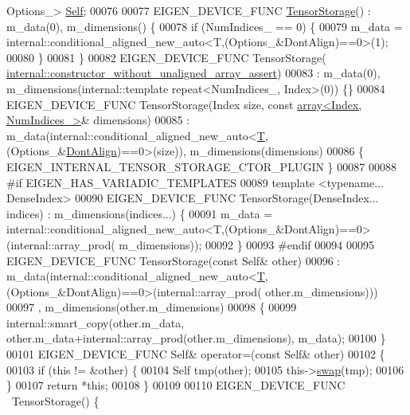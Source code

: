 \begin{DoxyCode}
       Options\_> \hyperlink{class_eigen_1_1_tensor_storage_3_01_t_00_01_d_sizes_3_01_index_type_00_01_num_indices___01_4_00_01_options___01_4}{Self};
00076 
00077     EIGEN\_DEVICE\_FUNC \hyperlink{class_eigen_1_1_tensor_storage}{TensorStorage}() : m\_data(0), m\_dimensions() \{
00078       \textcolor{keywordflow}{if} (NumIndices\_ == 0) \{
00079     m\_data = internal::conditional\_aligned\_new\_auto<T,(Options\_&DontAlign)==0>(1);
00080       \}
00081     \}
00082     EIGEN\_DEVICE\_FUNC TensorStorage(
      \hyperlink{struct_eigen_1_1internal_1_1constructor__without__unaligned__array__assert}{internal::constructor\_without\_unaligned\_array\_assert})
00083       : m\_data(0), m\_dimensions(internal::template repeat<NumIndices\_, Index>(0)) \{\}
00084     EIGEN\_DEVICE\_FUNC TensorStorage(Index size, \textcolor{keyword}{const} \hyperlink{class_eigen_1_1array}{array<Index, NumIndices\_>}& 
      dimensions)
00085         : m\_data(internal::conditional\_aligned\_new\_auto<\hyperlink{group___sparse_core___module}{T},(Options\_&\hyperlink{group__enums_ggaacded1a18ae58b0f554751f6cdf9eb13a40a452614141522dd313363dbbd65726}{DontAlign})==0>(size)), 
      m\_dimensions(dimensions)
00086       \{ EIGEN\_INTERNAL\_TENSOR\_STORAGE\_CTOR\_PLUGIN \}
00087 
00088 \textcolor{preprocessor}{#if EIGEN\_HAS\_VARIADIC\_TEMPLATES}
00089     \textcolor{keyword}{template} <\textcolor{keyword}{typename}... DenseIndex>
00090     EIGEN\_DEVICE\_FUNC TensorStorage(DenseIndex... indices) : m\_dimensions(indices...) \{
00091       m\_data = internal::conditional\_aligned\_new\_auto<T,(Options\_&DontAlign)==0>(internal::array\_prod(
      m\_dimensions));
00092     \}
00093 \textcolor{preprocessor}{#endif}
00094 
00095     EIGEN\_DEVICE\_FUNC TensorStorage(\textcolor{keyword}{const} Self& other)
00096       : m\_data(internal::conditional\_aligned\_new\_auto<\hyperlink{group___sparse_core___module}{T},(Options\_&DontAlign)==0>(internal::array\_prod(
      other.m\_dimensions)))
00097       , m\_dimensions(other.m\_dimensions)
00098     \{
00099       internal::smart\_copy(other.m\_data, other.m\_data+internal::array\_prod(other.m\_dimensions), m\_data);
00100     \}
00101     EIGEN\_DEVICE\_FUNC Self& operator=(\textcolor{keyword}{const} Self& other)
00102     \{
00103       \textcolor{keywordflow}{if} (\textcolor{keyword}{this} != &other) \{
00104         Self tmp(other);
00105         this->\hyperlink{endian_8c_a3ca5ecd34b04d6a243c054ac3a57f68d}{swap}(tmp);
00106       \}
00107       \textcolor{keywordflow}{return} *\textcolor{keyword}{this};
00108     \}
00109 
00110     EIGEN\_DEVICE\_FUNC  ~TensorStorage() \{ 

\end{DoxyCode}
